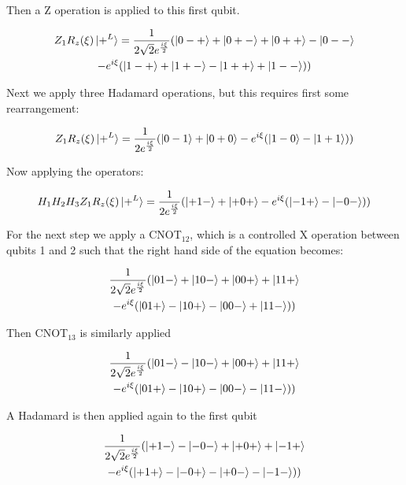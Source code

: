 Then a Z operation is applied to this first qubit. 

\begin{multline*}
Z_{1} R_{z}(\xi)\ket{+^{L}} = \frac{1}{2 \sqrt{2} e^{\frac{i \xi}{2}}}(\ket{0-+} +\ket{0+-} + \ket{0++} - \ket{0--} \\ 
- e^{i \xi}(\ket{1-+} +\ket{1+-} - \ket{1++} + \ket{1--})) \\
\end{multline*}

Next we apply three Hadamard operations, but this requires first some rearrangement:

\begin{multline*}
Z_{1} R_{z}(\xi)\ket{+^{L}} = \frac{1}{2 e^{\frac{i \xi}{2}}}(\ket{0-1} +\ket{0+0} - e^{i \xi}(\ket{1-0} - \ket{1+1})) \\
\end{multline*}

Now applying the operators:

\begin{equation*}
H_{1} H_{2} H_{3} Z_{1} R_{z}(\xi)\ket{+^{L}} = \frac{1}{2 e^{\frac{i \xi}{2}}}(\ket{+1-} +\ket{+0+} - e^{i \xi}(\ket{-1+} - \ket{-0-}))
\end{equation*}

For the next step we apply a CNOT$_{12}$, which is a controlled X operation between qubits 1 and 2 such that the right hand side of the equation becomes:

\begin{multline*}
\frac{1}{2 \sqrt{2} e^{\frac{i \xi}{2}}}(\ket{01-} + \ket{10-} +\ket{00+} + \ket{11+} \\
- e^{i \xi}(\ket{01+} - \ket{10+} - \ket{00-} + \ket{11-})) \\
\end{multline*}

Then CNOT$_{13}$ is similarly applied

\begin{multline*}
\frac{1}{2 \sqrt{2} e^{\frac{i \xi}{2}}}(\ket{01-} - \ket{10-} +\ket{00+} + \ket{11+} \\
- e^{i \xi}(\ket{01+} - \ket{10+} - \ket{00-} - \ket{11-})) \\
\end{multline*}

A Hadamard is then applied again to the first qubit

\begin{multline}
\frac{1}{2 \sqrt{2} e^{\frac{i \xi}{2}}}(\ket{+1-} - \ket{-0-} +\ket{+0+} + \ket{-1+} \\
- e^{i \xi}(\ket{+1+} - \ket{-0+} - \ket{+0-} - \ket{-1-})) \\
\end{multline}

